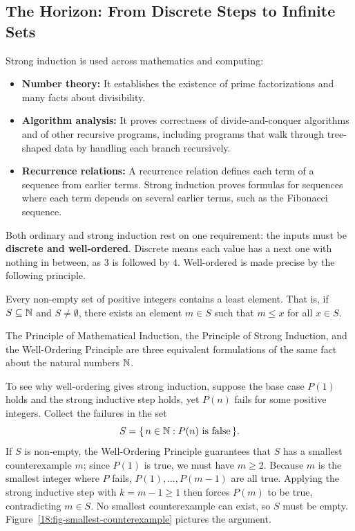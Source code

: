 \subsection{The Horizon: From Discrete Steps to Infinite Sets}

Strong induction is used across mathematics and computing:
\begin{itemize}
\item \textbf{Number theory:} It establishes the existence of prime factorizations and many facts about divisibility.
\item \textbf{Algorithm analysis:} It proves correctness of divide-and-conquer algorithms and of other recursive programs, including programs that walk through tree-shaped data by handling each branch recursively.
\item \textbf{Recurrence relations:} A recurrence relation defines each term of a sequence from earlier terms. Strong induction proves formulas for sequences where each term depends on several earlier terms, such as the Fibonacci sequence.
\end{itemize}

Both ordinary and strong induction rest on one requirement: the inputs must be \textbf{discrete and well-ordered}. Discrete means each value has a next one with nothing in between, as $3$ is followed by $4$. Well-ordered is made precise by the following principle.

\begin{definition}
\label{18:def-well-ordering}
Every non-empty set of positive integers contains a least element. That is, if $S \subseteq \mathbb{N}$ and $S \ne \emptyset$, there exists an element $m \in S$ such that $m \le x$ for all $x \in S$.
\end{definition}

The Principle of Mathematical Induction, the Principle of Strong Induction, and the Well-Ordering Principle are three equivalent formulations of the same fact about the natural numbers $\mathbb{N}$. 

To see why well-ordering gives strong induction, suppose the base case $P(1)$ holds and the strong inductive step holds, yet $P(n)$ fails for some positive integers. Collect the failures in the set
\[
S = \{\, n \in \mathbb{N} : P(n) \text{ is false} \,\}.
\]
If $S$ is non-empty, the Well-Ordering Principle guarantees that $S$ has a smallest counterexample $m$; since $P(1)$ is true, we must have $m \ge 2$. Because $m$ is the smallest integer where $P$ fails, $P(1), \dots, P(m-1)$ are all true. Applying the strong inductive step with $k = m - 1 \ge 1$ then forces $P(m)$ to be true, contradicting $m \in S$. No smallest counterexample can exist, so $S$ must be empty. Figure~\ref{18:fig-smallest-counterexample} pictures the argument.

